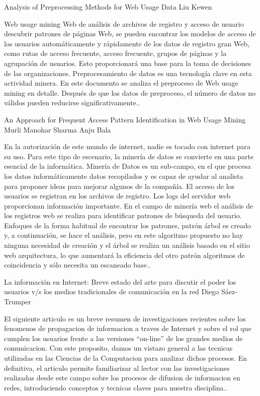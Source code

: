 Analysis of Preprocessing Methods for Web Usage Data
Liu Kewen

Web usage mining Web de análisis de archivos de registro y acceso de usuario descubrir patrones de páginas Web, se pueden encontrar los modelos de acceso de los  usuarios automáticamente y rápidamente de los datos de registro gran Web, como rutas de acceso frecuente, acceso frecuente, grupos de páginas y la  agrupación de usuarios. Esto proporcionará una base  para la toma de decisiones de las organizaciones. Preprocesamiento de datos es una tecnología clave en esta actividad minera. En este documento se analiza el preproceso de Web usage mining en detalle. Después de que los datos de preproceso, el número de datos no válidos pueden reducirse significativamente..


An Approach for Frequent Access Pattern Identification in Web Usage Mining
Murli Manohar Sharma
Anju Bala

En la autorización de este mundo de internet, nadie es tocado con internet para su uso. Para este tipo de escenario, la minería de datos se convierte en una parte esencial de la informática. Minería de Datos es un sub-campo, en el que procesa los datos informáticamente datos recopilados y es capaz de ayudar al analista para proponer ideas para mejorar algunos de la compañía. El acceso de los usuarios se registran en los archivos de registro. Los logs del servidor web proporcionan información importante. En el campo de minería web el análisis de los registros web se realiza para identificar patrones de búsqueda del usuario. Enfoques de la forma habitual de encontrar los patrones, patrón árbol es creado y, a continuación, se hace el análisis, pero en este algoritmo propuesto no hay ninguna necesidad de creación y el árbol se realiza un análisis basado en el sitio web arquitectura, lo que aumentará la eficiencia del otro patrón algoritmos de coincidencia y sólo necesita un escaneado base..



La información en Internet: Breve estado del arte para discutir el poder los usuarios v/s los medios tradicionales de comunicación en la red
Diego Sáez-Trumper

El siguiente articulo es un breve resumen de investigaciones recientes sobre los fenomenos de propagacion de informacion a traves de Internet y sobre el rol que cumplen los usuarios frente a las versiones “on-line” de los grandes medios de comunicacion. Con este proposito, damos un vistazo general a las tecnicas utilizadas en las Ciencias de la Computacion para analizar dichos procesos. En definitiva, el articulo permite familiarizar al lector con las investigaciones realizadas desde este campo sobre los procesos de difusion de informacion en redes, introduciendo conceptos y tecnicas claves para nuestra disciplina..



